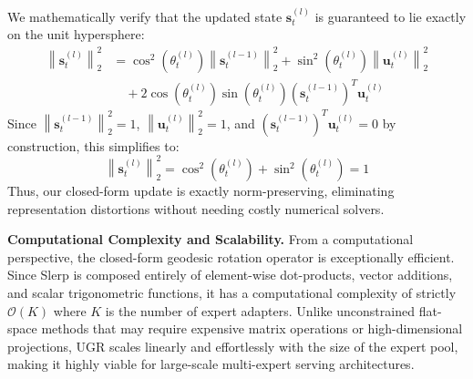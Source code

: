 We mathematically verify that the updated state $\mathbf{s}_t^{(l)}$ is guaranteed to lie exactly on the unit hypersphere:
\begin{align}
\left\|\mathbf{s}_t^{(l)}\right\|_2^2 &= \cos^2\left(\theta_t^{(l)}\right) \left\|\mathbf{s}_t^{(l-1)}\right\|_2^2 + \sin^2\left(\theta_t^{(l)}\right) \left\|\mathbf{u}_t^{(l)}\right\|_2^2 \nonumber \\
&\quad + 2\cos\left(\theta_t^{(l)}\right)\sin\left(\theta_t^{(l)}\right) \left(\mathbf{s}_t^{(l-1)}\right)^T \mathbf{u}_t^{(l)}
\end{align}
Since $\left\|\mathbf{s}_t^{(l-1)}\right\|_2^2 = 1$, $\left\|\mathbf{u}_t^{(l)}\right\|_2^2 = 1$, and $\left(\mathbf{s}_t^{(l-1)}\right)^T \mathbf{u}_t^{(l)} = 0$ by construction, this simplifies to:
\begin{equation}
\left\|\mathbf{s}_t^{(l)}\right\|_2^2 = \cos^2\left(\theta_t^{(l)}\right) + \sin^2\left(\theta_t^{(l)}\right) = 1
\end{equation}
Thus, our closed-form update is exactly norm-preserving, eliminating representation distortions without needing costly numerical solvers.

\textbf{Computational Complexity and Scalability.} From a computational perspective, the closed-form geodesic rotation operator is exceptionally efficient. Since Slerp is composed entirely of element-wise dot-products, vector additions, and scalar trigonometric functions, it has a computational complexity of strictly $\mathcal{O}(K)$ where $K$ is the number of expert adapters. Unlike unconstrained flat-space methods that may require expensive matrix operations or high-dimensional projections, UGR scales linearly and effortlessly with the size of the expert pool, making it highly viable for large-scale multi-expert serving architectures.

